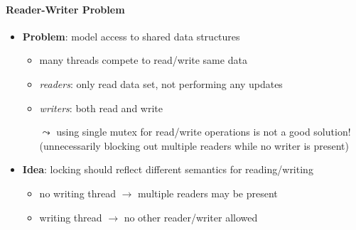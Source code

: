 \paragraph{Reader-Writer Problem}
\begin{itemize}
  \item \textbf{Problem}: model access to shared data structures
  \begin{itemize}
    \item many threads compete to read/write same data
    \item \emph{readers}: only read data set, not performing any updates
    \item \emph{writers}: both read and write
    \item[$ \leadsto $] using single mutex for read/write operations is not a good solution! (unnecessarily blocking out multiple readers while no writer is present)
  \end{itemize}
  \item \textbf{Idea}: locking should reflect different semantics for reading/writing
  \begin{itemize}
    \item no writing thread $ \to $ multiple readers may be present
    \item writing thread $ \to $ no other reader/writer allowed
  \end{itemize}
\end{itemize}

